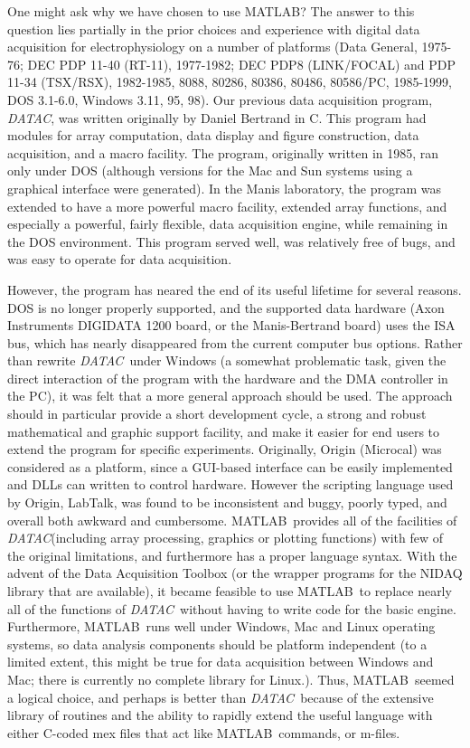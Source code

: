 \documentclass[11pt, letterpaper, titlepage]{paper}
\newcommand{\datac}{\textsl{DATAC}}
\newcommand{\ml}{\textsf{MATLAB}}
\begin{document}
One might ask why we have chosen to use \ml? The answer to this question lies partially 
in the prior choices and experience with digital data acquisition for electrophysiology 
on a number of platforms (Data General, 1975-76; DEC PDP 11-40 (RT-11), 1977-1982; DEC 
PDP8 (LINK/FOCAL) and PDP 11-34 (TSX/RSX), 1982-1985, 8088, 80286, 80386, 80486, 
80586/PC, 1985-1999, DOS 3.1-6.0, Windows 3.11, 95, 98). Our previous data acquisition 
program, \datac, was written originally by Daniel Bertrand in C. This program had modules 
for array computation, data display and figure construction, data acquisition, and a 
macro facility. The program, originally written in 1985, ran only under DOS (although 
versions for the Mac and Sun systems using a graphical interface were generated). In the 
Manis laboratory, the program was extended to have a more powerful macro facility, 
extended array functions, and especially a powerful, fairly flexible, data acquisition 
engine, while remaining in the DOS environment. This program served well, was relatively 
free of bugs, and was easy to operate for data acquisition.

However, the program has neared the end of its useful lifetime for several reasons. DOS 
is no longer properly supported, and the supported data hardware (Axon Instruments 
DIGIDATA 1200 board, or the Manis-Bertrand board) uses the ISA bus, which has nearly 
disappeared from the current computer bus options. Rather than rewrite \datac\ under 
Windows (a somewhat problematic task, given the direct interaction of the program with 
the hardware and the DMA controller in the PC), it was felt that a more general approach 
should be used. The approach should in particular provide a short development cycle, a 
strong and robust mathematical and graphic support facility, and make it easier for end 
users to extend the program for specific experiments. Originally, Origin (Microcal) was 
considered as a platform, since a GUI-based interface can be easily implemented and DLLs 
can written to control hardware. However the scripting language used by Origin, LabTalk, 
was found to be inconsistent and buggy, poorly typed, and overall both awkward and 
cumbersome. \ml\ provides all of the facilities of \datac (including array processing, 
graphics or plotting functions) with few of the original limitations, and furthermore has 
a proper language syntax. With the advent of the Data Acquisition Toolbox (or the wrapper 
programs for the NIDAQ library that are available), it became feasible to use \ml\ to 
replace nearly all of the functions of \datac\ without having to write code for the basic 
engine. Furthermore, \ml\ runs well under Windows, Mac and Linux operating systems, so 
data analysis components should be platform independent (to a limited extent, this might 
be true for data acquisition between Windows and Mac; there is currently no complete 
library for Linux.). Thus, \ml\ seemed a logical choice, and perhaps is better than 
\datac\ because of the extensive library of routines and the ability to rapidly extend 
the useful language with either C-coded mex files that act like \ml\ commands, or 
m-files.
\end{document}
